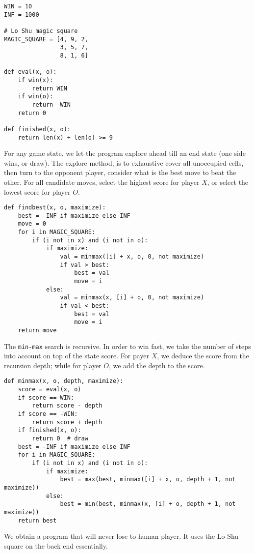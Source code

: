 \documentclass[UTF8]{article}
\begin{document}
\begin{enumerate}
\begin{lstlisting}
WIN = 10
INF = 1000

# Lo Shu magic square
MAGIC_SQUARE = [4, 9, 2,
                3, 5, 7,
                8, 1, 6]

def eval(x, o):
    if win(x):
        return WIN
    if win(o):
        return -WIN
    return 0

def finished(x, o):
    return len(x) + len(o) >= 9
\end{lstlisting}

For any game state, we let the program explore ahead till an end state (one side wins, or draw). The explore method, is to exhaustive cover all unoccupied cells, then turn to the opponent player, consider what is the best move to beat the other. For all candidate moves, select the highest score for player $X$, or select the lowest score for player $O$.

\begin{lstlisting}
def findbest(x, o, maximize):
    best = -INF if maximize else INF
    move = 0
    for i in MAGIC_SQUARE:
        if (i not in x) and (i not in o):
            if maximize:
                val = minmax([i] + x, o, 0, not maximize)
                if val > best:
                    best = val
                    move = i
            else:
                val = minmax(x, [i] + o, 0, not maximize)
                if val < best:
                    best = val
                    move = i
    return move
\end{lstlisting}

The \texttt{min-max} search is recursive. In order to win fast, we take the number of steps into account on top of the state score. For payer $X$, we deduce the score from the recursion depth; while for player $O$, we add the depth to the score.

\begin{lstlisting}
def minmax(x, o, depth, maximize):
    score = eval(x, o)
    if score == WIN:
        return score - depth
    if score == -WIN:
        return score + depth
    if finished(x, o):
        return 0  # draw
    best = -INF if maximize else INF
    for i in MAGIC_SQUARE:
        if (i not in x) and (i not in o):
            if maximize:
                best = max(best, minmax([i] + x, o, depth + 1, not maximize))
            else:
                best = min(best, minmax(x, [i] + o, depth + 1, not maximize))
    return best
\end{lstlisting}

We obtain a program that will never lose to human player. It uses the Lo Shu square on the back end essentially.


\end{enumerate}
\end{document}
